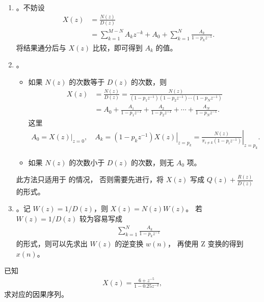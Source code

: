 \begin{enumerate}
    \item {}。不妨设
        \begin{align*}
            X(z) & = \frac{N(z)}{D(z)} \\
            & = \sum_{k = 1}^{M-N}A_kz^{-k} + A_0 + \sum_{k = 1}^{N}\frac{A_k}{1 - p_kz^{-1}}.
        \end{align*}
        将结果通分后与 $X(z)$ 比较，即可得到 $A_k$ 的值。
    \item {}。
        \begin{itemize}
            \item 如果 $N(z)$ 的次数等于 $D(z)$ 的次数，则
                \begin{align*}
                    X(z) & = \frac{N(z)}{D(z)} = \frac{N(z)}{(1 - p_1z^{-1})(1 - p_2z^{-1})\cdots(1 - p_Nz^{-1})} \\
                    & = A_0 + \frac{A_1}{1 - p_1z^{-1}} + \frac{A_2}{1 - p_2z^{-1}} + \cdots + \frac{A_N}{1 - p_Nz^{-1}}.
                \end{align*}
                这里
                \begin{align*}
                    A_0 = \left.X(z)\right|_{z = 0}, \quad A_k = \left.(1 - p_kz^{-1})X(z)\right|_{z = p_k} = \left.\frac{N(z)}{\pi_{i \neq k}(1 - p_iz^{-1})}\right|_{z = p_k}.
                \end{align*}
            \item 如果 $N(z)$ 的次数小于 $D(z)$ 的次数，则无 $A_0$ 项。
        \end{itemize}
        此方法只适用于 的情况，
        否则需要先进行，将 $X(z)$ 写成 $Q(z) + \frac{R(z)}{D(z)}$ 的形式。
    \item {}。记 $W(z) = 1/D(z)$，则 $X(z) = N(z)W(z)$。
        若 $W(z) = 1/D(z)$ 较为容易写成
        \begin{align*}
            \sum_{k = 1}^{N}\frac{A_k}{1 - p_kz^{-1}}
        \end{align*}
        的形式，则可以先求出 $W(z)$ 的逆变换 $w(n)$，
        再使用 Z 变换的得到 $x(n)$。
\end{enumerate}

\begin{example}
    已知
    \begin{align*}
        X(z) = \frac{6 + z^{-5}}{1 - 0.25z^{-2}},
    \end{align*}
    求对应的因果序列。
\end{example}

